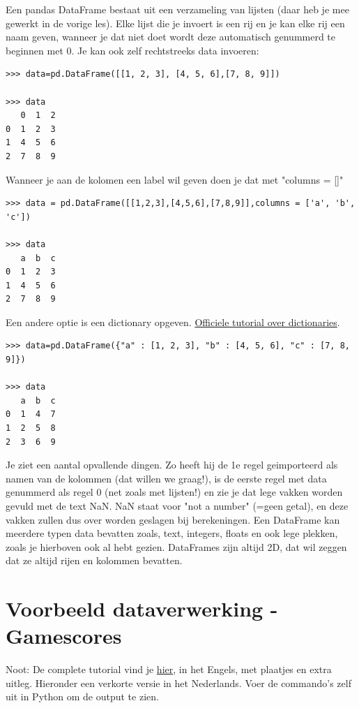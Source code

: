 Een pandas DataFrame bestaat uit een verzameling van lijsten (daar heb je mee gewerkt in de vorige les). Elke lijst die je invoert is een rij en je kan elke rij een naam geven, wanneer je dat niet doet wordt deze automatisch genummerd te beginnen met 0.
Je kan ook zelf rechtstreeks data invoeren:

\begin{lstlisting}[frame=single]
>>> data=pd.DataFrame([[1, 2, 3], [4, 5, 6],[7, 8, 9]])

>>> data
   0  1  2
0  1  2  3
1  4  5  6
2  7  8  9

\end{lstlisting}
Wanneer je aan de kolomen een label wil geven doen je dat met "columns = []"

\begin{lstlisting}[frame=single]
>>> data = pd.DataFrame([[1,2,3],[4,5,6],[7,8,9]],columns = ['a', 'b', 'c'])

>>> data
   a  b  c
0  1  2  3
1  4  5  6
2  7  8  9

\end{lstlisting}
Een andere optie is een dictionary opgeven. \href{https://docs.python.org/2/tutorial/datastructures.html#dictionaries}{Officiele tutorial over dictionaries}.

\begin{lstlisting}[frame=single]
>>> data=pd.DataFrame({"a" : [1, 2, 3], "b" : [4, 5, 6], "c" : [7, 8, 9]})

>>> data
   a  b  c
0  1  4  7
1  2  5  8
2  3  6  9

\end{lstlisting}
Je ziet een aantal opvallende dingen. Zo heeft hij de 1e regel geimporteerd als namen van de kolommen (dat willen we graag!), is de eerste regel met data genummerd als regel 0 (net zoals met lijsten!) en zie je dat lege vakken worden gevuld met de text NaN. NaN staat voor "not a number" (=geen getal), en deze vakken zullen dus over worden geslagen bij berekeningen.
Een DataFrame kan meerdere typen data bevatten zoals, text, integers, floats en ook lege plekken, zoals je hierboven ook al hebt gezien. DataFrames zijn altijd 2D, dat wil zeggen dat ze altijd rijen en kolommen bevatten.

\section{Voorbeeld dataverwerking - Gamescores}
Noot: De complete tutorial vind je \href{https://www.dataquest.io/blog/pandas-python-tutorial/}{hier}, in het Engels, met plaatjes en extra uitleg. Hieronder een verkorte versie in het Nederlands. Voer de commando's zelf uit in Python om de output te zien. 

